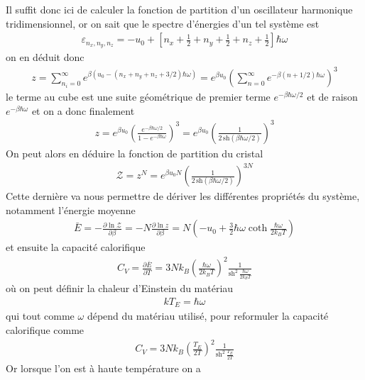 \documentclass[12pt,prb,aps,epsf]{article}
\begin{document}
 Il suffit donc ici de calculer la fonction de partition d'un oscillateur harmonique tridimensionnel, or on sait que le spectre d'énergies d'un tel système est 
 \begin{eqnarray}
 \varepsilon_{n_x,n_y,n_z} = -u_0 + \left[n_x +\frac{1}{2} +n_y +\frac{1}{2} + n_z +\frac{1}{2}\right]\hbar \omega
 \end{eqnarray}
on en déduit donc 
\begin{eqnarray}
z = \sum_{n_i=0}^{\infty} e^{\beta (u_0 - (n_x+n_y+n_z+3/2)\hbar\omega)} = e^{\beta u_0} \left( \sum_{n=0}^{\infty} e^{-\beta(n+1/2)\hbar \omega}\right)^3
\end{eqnarray}
le terme au cube est une suite géométrique de premier terme $e^{-\beta\hbar\omega/2}$ et de raison $e^{-\beta \hbar \omega}$ et on a donc finalement
\begin{eqnarray}
z = e^{\beta u_0}\left(\frac{e^{-\beta \hbar \omega /2}}{1- e^{-\beta \hbar \omega}}\right)^3 = e^{\beta u_0}\left(\frac{1}{2\,\mathrm{sh} (\beta \hbar \omega /2)}\right)^3
\end{eqnarray}
On peut alors en déduire la fonction de partition du cristal 
\begin{eqnarray}
\mathcal{Z} = z^N = e^{\beta u_0 N}\left(\frac{1}{2\,\mathrm{sh} (\beta \hbar \omega /2)}\right)^{3N}
\end{eqnarray}
Cette dernière va nous permettre de dériver les différentes propriétés du système, notamment l'énergie moyenne 
\begin{eqnarray}
\bar{E}= -\frac{\partial \ln \mathcal{Z}}{\partial \beta} = -N\frac{\partial \ln z}{\partial \beta} = N\left(-u_0 + \frac{3}{2} \hbar \omega \coth \frac{\hbar \omega}{2k_B T}\right)
\end{eqnarray}
et ensuite la capacité calorifique
\begin{eqnarray}
C_V = \frac{\partial \bar{E}}{\partial T} = 3Nk_B\left(\frac{\hbar \omega}{2k_B T}\right)^2 \frac{1}{\mathrm{sh}^2\, \frac{\hbar \omega}{2k_BT}}
\end{eqnarray}
où on peut définir la chaleur d'Einstein du matériau 
\begin{eqnarray}
kT_E = \hbar \omega
\end{eqnarray}
qui tout comme $\omega$ dépend du matériau utilisé, pour reformuler la capacité calorifique comme 
\begin{eqnarray}
C_V = 3N k_B \left(\frac{T_E}{2T}\right)^2 \frac{1}{\mathrm{sh}^2\,\frac{T_E}{2T}}
\end{eqnarray}
Or lorsque l'on est à haute température on a 
\end{document}
